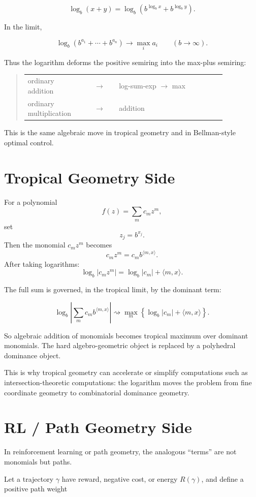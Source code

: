 \documentclass[11pt]{article}
\makeatletter
\newenvironment{dictionary}
  {\begin{quote}\begin{tabular}{@{}p{0.30\linewidth}c p{0.54\linewidth}@{}}}
  {\end{tabular}\end{quote}}
\makeatother
\begin{document}
\[
\log_b(x+y)
=
\log_b\left(b^{\log_b x}+b^{\log_b y}\right).
\]

In the limit,

\[
\log_b\left(b^{a_1}+\cdots+b^{a_n}\right)
\longrightarrow
\max_i a_i
\qquad
(b\to\infty).
\]

Thus the logarithm deforms the positive semiring into the max-plus semiring:

\begin{dictionary}
ordinary addition
  & \(\longrightarrow\) &
log-sum-exp \(\longrightarrow\) max \\
ordinary multiplication
  & \(\longrightarrow\) &
addition
\end{dictionary}

This is the same algebraic move in tropical geometry and in Bellman-style
optimal control.

\section{Tropical Geometry Side}

For a polynomial
\[
f(z)
=
\sum_m c_m z^m,
\]
set
\[
z_j=b^{x_j}.
\]
Then the monomial \(c_m z^m\) becomes
\[
c_m z^m
=
c_m b^{\langle m,x\rangle}.
\]
After taking logarithms:
\[
\log_b |c_m z^m|
=
\log_b |c_m|+\langle m,x\rangle.
\]

The full sum is governed, in the tropical limit, by the dominant term:

\[
\log_b
\left|
\sum_m c_m b^{\langle m,x\rangle}
\right|
\rightsquigarrow
\max_m
\left\{
\log_b |c_m|+\langle m,x\rangle
\right\}.
\]

So algebraic addition of monomials becomes tropical maximum over dominant
monomials. The hard algebro-geometric object is replaced by a polyhedral
dominance object.

This is why tropical geometry can accelerate or simplify computations such as
intersection-theoretic computations: the logarithm moves the problem from fine
coordinate geometry to combinatorial dominance geometry.

\section{RL / Path Geometry Side}

In reinforcement learning or path geometry, the analogous ``terms'' are not
monomials but paths.

Let a trajectory \(\gamma\) have reward, negative cost, or energy
\(R(\gamma)\), and define a positive path weight
\end{document}
